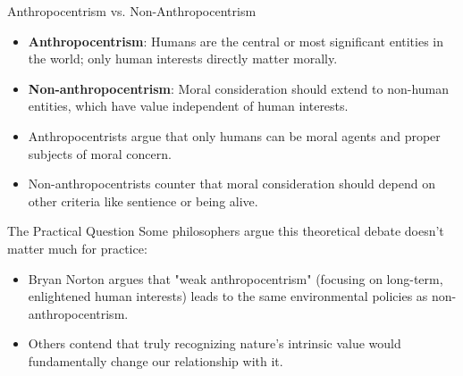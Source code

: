 \documentclass{beamer}
\begin{document}
	\begin{frame}{Anthropocentrism vs. Non-Anthropocentrism}
		\begin{itemize}
			\item \textbf{Anthropocentrism}: Humans are the central or most significant entities in the world; only human interests directly matter morally.
			\item \textbf{Non-anthropocentrism}: Moral consideration should extend to non-human entities, which have value independent of human interests.
			\item Anthropocentrists argue that only humans can be moral agents and proper subjects of moral concern.
			\item Non-anthropocentrists counter that moral consideration should depend on other criteria like sentience or being alive.
		\end{itemize}
		
		\begin{alertblock}{The Practical Question}
			\scriptsize
			Some philosophers argue this theoretical debate doesn't matter much for practice:
			\begin{itemize}
				\item Bryan Norton argues that "weak anthropocentrism" (focusing on long-term, enlightened human interests) leads to the same environmental policies as non-anthropocentrism.
				\item Others contend that truly recognizing nature's intrinsic value would fundamentally change our relationship with it.
			\end{itemize}
		\end{alertblock}
	\end{frame}
	
\end{document}
